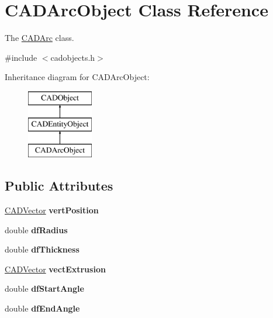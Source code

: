\hypertarget{class_c_a_d_arc_object}{}\section{C\+A\+D\+Arc\+Object Class Reference}
\label{class_c_a_d_arc_object}


The \hyperlink{class_c_a_d_arc}{C\+A\+D\+Arc} class.  




{\ttfamily \#include $<$cadobjects.\+h$>$}

Inheritance diagram for C\+A\+D\+Arc\+Object\+:\begin{figure}[H]
\begin{center}
\leavevmode
\includegraphics[height=3.000000cm]{class_c_a_d_arc_object}
\end{center}
\end{figure}
\subsection*{Public Attributes}
\begin{DoxyCompactItemize}
\item 
\hyperlink{class_c_a_d_vector}{C\+A\+D\+Vector} {\bfseries vert\+Position}\hypertarget{class_c_a_d_arc_object_ad108019dab2c74864b6e2cbc324f124e}{}\label{class_c_a_d_arc_object_ad108019dab2c74864b6e2cbc324f124e}

\item 
double {\bfseries df\+Radius}\hypertarget{class_c_a_d_arc_object_ae4d725a232be0bab918c3d5a42c62850}{}\label{class_c_a_d_arc_object_ae4d725a232be0bab918c3d5a42c62850}

\item 
double {\bfseries df\+Thickness}\hypertarget{class_c_a_d_arc_object_aab0ddf06e36b1076479e10b67ea6318b}{}\label{class_c_a_d_arc_object_aab0ddf06e36b1076479e10b67ea6318b}

\item 
\hyperlink{class_c_a_d_vector}{C\+A\+D\+Vector} {\bfseries vect\+Extrusion}\hypertarget{class_c_a_d_arc_object_a6ca29b696f21ffcbec73c1ccb76af871}{}\label{class_c_a_d_arc_object_a6ca29b696f21ffcbec73c1ccb76af871}

\item 
double {\bfseries df\+Start\+Angle}\hypertarget{class_c_a_d_arc_object_a8d1dd7e43a8af7fd0be782ec0ca25218}{}\label{class_c_a_d_arc_object_a8d1dd7e43a8af7fd0be782ec0ca25218}

\item 
double {\bfseries df\+End\+Angle}\hypertarget{class_c_a_d_arc_object_a908abe29d8cb4cc2cfdfcacc42d8a896}{}\label{class_c_a_d_arc_object_a908abe29d8cb4cc2cfdfcacc42d8a896}

\end{DoxyCompactItemize}

